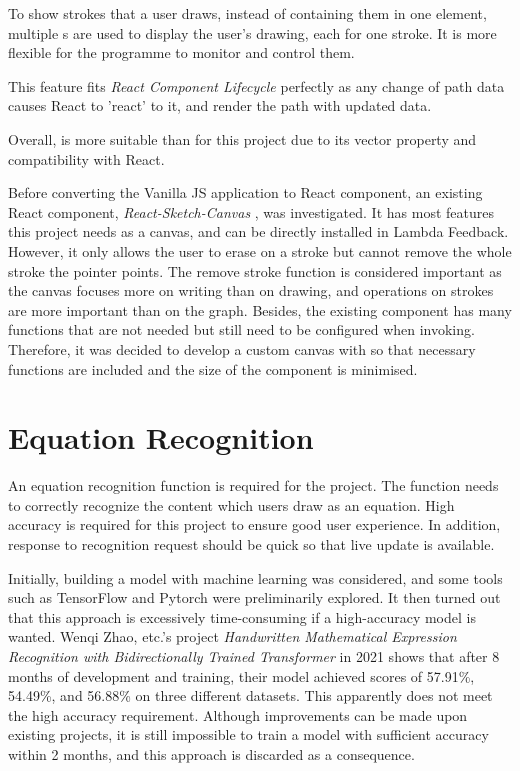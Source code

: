 \documentclass[12pt,twoside]{report}
\begin{document}
To show strokes that a user draws, instead of containing them in one  element, multiple s are used to display the user's drawing, each for one stroke. It is more flexible for the programme to monitor and control them. 

This feature fits \textit{React Component Lifecycle} perfectly as any change of path data causes React to 'react' to it, and render the path with updated data.

Overall,  is more suitable than  for this project due to its vector property and compatibility with React.

Before converting the Vanilla JS application to React component, an
existing React component, \textit{React-Sketch-Canvas}
\cite{react-sketch-canvas}, was investigated. It has most features this project
needs as a canvas, and can be directly installed in Lambda Feedback. However, it
only allows the user to erase on a stroke but cannot remove the whole stroke the
pointer points. The remove stroke function is considered important as the canvas
focuses more on writing than on drawing, and operations on strokes are more
important than on the graph. Besides, the existing component has many functions that are not needed but still need to be configured when invoking. Therefore, it was decided to develop a custom canvas with  so that necessary functions are included and the size of the component is minimised.



\section{Equation Recognition}
\label{bgEqnRecognition}
An equation recognition function is required for the project. The function needs
to correctly recognize the content which users draw as an equation. High accuracy is required for this project to ensure good user experience. In addition, response to recognition request should be quick so that live update is available.

Initially, building a model with machine learning was considered, and some tools
such as TensorFlow and Pytorch were preliminarily explored. It then turned out
that this approach is excessively time-consuming if a high-accuracy model is
wanted. Wenqi Zhao, etc.'s project \textit{Handwritten Mathematical Expression
Recognition with Bidirectionally Trained Transformer} \cite{zhao2021handwritten}
in 2021 shows that after 8 months of development and training, their model
achieved scores of 57.91\%, 54.49\%, and 56.88\% on three different datasets.
This apparently does not meet the high accuracy requirement. Although improvements can be made upon existing projects, it is still impossible to train a model with sufficient accuracy within 2 months, and this approach is discarded as a consequence.
\end{document}
